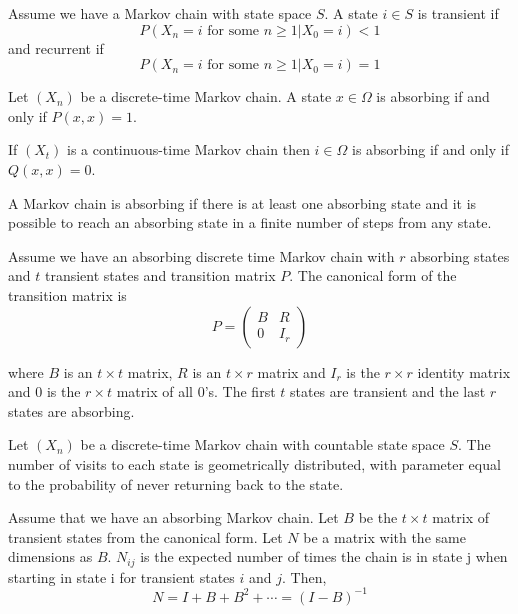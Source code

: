\begin{defn} \cite{grimmett2001}
Assume we have a Markov chain with state space $S$.
A state $i \in S$ is transient if
$$
P(X_n = i \text{ for some } n \geq 1 | X_0 = i) < 1
$$
and recurrent if
$$
P(X_n = i \text{ for some } n \geq 1 | X_0 = i) = 1
$$
\end{defn}

\begin{defn} \cite{grinstead2003}
Let $(X_n)$ be a discrete-time Markov chain.
A state $x \in \Omega$ is absorbing if and only if $P(x,x) = 1$.

If $(X_t)$ is a continuous-time Markov chain then $i \in \Omega$ is absorbing if and only if $Q(x,x) = 0$.
\end{defn}

\begin{defn} \cite{grinstead2003}
A Markov chain is absorbing if there is at least one absorbing state and it is possible to reach an absorbing state in a finite number of steps from any state.
\end{defn}

\begin{defn} \cite{grinstead2003}
Assume we have an absorbing discrete time Markov chain with $r$ absorbing states and $t$ transient states and  transition matrix $P$.
The canonical form of the transition matrix is
\begin{equation}
    P = \begin{pmatrix}
        B & R\\
        0 & I_{r}
    \end{pmatrix}
\end{equation}

where $B$ is an $t \times t$ matrix, $R$ is an $t \times r$ matrix and $I_{r}$ is the $r \times r$ identity matrix and $0$ is the $r \times t$ matrix of all 0's.
The first $t$ states are transient and the last $r$ states are absorbing.
\end{defn}

\begin{theorem}\label{thm:visits_geom}
Let $(X_n)$ be a discrete-time Markov chain with countable state space $S$.
The number of visits to each state is geometrically distributed, with parameter equal to the probability of never returning back to the state.
\end{theorem}

\begin{theorem} \label{thm:fund_exp} \cite{grinstead2003}
Assume that we have an absorbing Markov chain.
Let $B$ be the  $t \times t$ matrix of transient states from the canonical form.
Let $N$ be a matrix with the same dimensions as $B$.
$N_{ij}$ is the expected number of times the chain is in state j when starting in state i for transient states $i$ and $j$. Then,
\begin{equation}
    N = I + B + B^2 + \cdots = (I - B)^{-1}
\end{equation}
\end{theorem}

